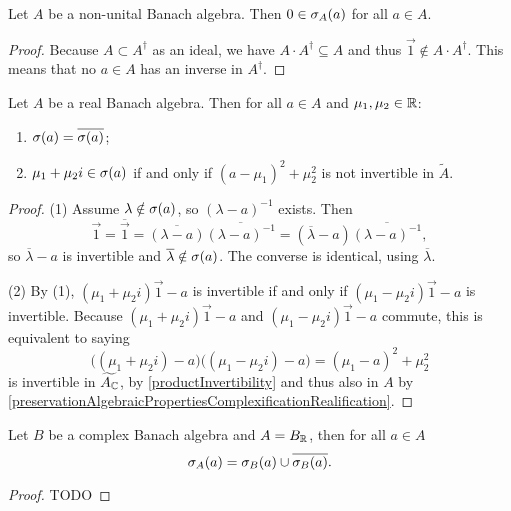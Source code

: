 \begin{lemma} \label{zeroSpectrumNonunitalAlgebra}
Let $A$ be a non-unital Banach algebra. Then $0\in\sigma_A(a)$ for all $a\in A$.
\end{lemma}
\begin{proof}
Because $A\subset A^\dagger$ as an ideal, we have $A\cdot A^\dagger \subseteq A$ and thus $\vec{1} \notin A\cdot A^\dagger$. This means that no $a\in A$ has an inverse in $A^\dagger$.
\end{proof}

\begin{lemma}
Let $A$ be a real Banach algebra. Then for all $a\in A$ and $\mu_1,\mu_2\in \mathbb{R}$:
\begin{enumerate}
\item $\sigma(a) = \overline{\sigma(a)}$;
\item $\mu_1 + \mu_2 i \in \sigma(a)$ \textup{if and only if} $(a-\mu_1)^2+\mu_2^2$ is not invertible in $\tilde{A}$.
\end{enumerate}
\end{lemma}
\begin{proof}
(1) Assume $\lambda \notin \sigma(a)$, so $(\lambda-a)^{-1}$ exists. Then
\[ \vec{1} = \overline{\vec{1}} = \overline{(\lambda-a)}\overline{(\lambda-a)^{-1}} = (\overline{\lambda}-a)\overline{(\lambda-a)^{-1}}, \]
so $\overline{\lambda}-a$ is invertible and $\overline{\lambda}\notin \sigma(a)$. The converse is identical, using $\overline{\lambda}$.

(2) By (1), $(\mu_1 + \mu_2 i)\vec{1}- a$ is invertible if and only if $(\mu_1 - \mu_2 i)\vec{1}-a$ is invertible. Because $(\mu_1 + \mu_2 i)\vec{1}-a$ and $(\mu_1 - \mu_2 i)\vec{1}-a$ commute, this is equivalent to saying
\[ \big((\mu_1 + \mu_2 i)-a\big)\big((\mu_1 - \mu_2 i)-a\big) = (\mu_1-a)^2 + \mu_2^2 \]
is invertible in $\widetilde{A_{\mathbb{C}}}$, by \ref{productInvertibility} and thus also in $A$ by \ref{preservationAlgebraicPropertiesComplexificationRealification}.
\end{proof}

\begin{proposition}
Let $B$ be a complex Banach algebra and $A = B_{\mathbb{R}}$, then for all $a\in A$
\[ \sigma_A(a) = \sigma_B(a) \cup \overline{\sigma_B(a)}. \]
\end{proposition}
\begin{proof}
TODO
\end{proof}

